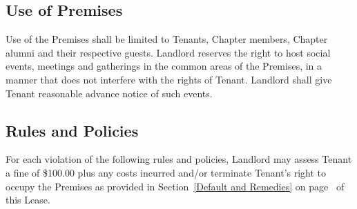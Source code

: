 \documentclass{article}
\begin{document}
\subsection{Use of Premises}
Use of the Premises shall be limited to Tenants, Chapter members, Chapter alumni
and their respective guests. Landlord reserves the right to host social events,
meetings and gatherings in the common areas of the Premises, in a manner that
does not interfere with the rights of Tenant. Landlord shall give Tenant
reasonable advance notice of such events.

\subsection{Rules and Policies}
For each violation of the following rules and policies, Landlord may assess
Tenant a fine of \$100.00 plus any costs incurred and/or terminate Tenant’s
right to occupy the Premises as provided in Section~\ref{Default and Remedies}
on page~\pageref{Default and Remedies} of this Lease.
\end{document}
